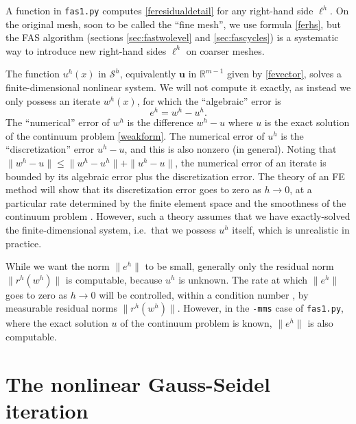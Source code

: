 \documentclass[letterpaper,final,12pt,reqno]{amsart}
\newcommand{\RR}{\mathbb{R}}
\newcommand{\bu}{\mathbf{u}}
\begin{document}
A function in \texttt{fas1.py} computes \eqref{feresidualdetail} for any right-hand side $\ell^h$.  On the original mesh, soon to be called the ``fine mesh'', we use formula \eqref{ferhs}, but the FAS algorithm (sections \ref{sec:fastwolevel} and \ref{sec:fascycles}) is a systematic way to introduce new right-hand sides $\ell^h$ on coarser meshes.

The function $u^h(x)$ in $\mathcal{S}^h$, equivalently $\bu$ in $\RR^{m-1}$ given by \eqref{fevector}, solves a finite-dimensional nonlinear system.  We will not compute it exactly, as instead we only possess an iterate $w^h(x)$, for which the ``algebraic'' error is
\begin{equation}
  e^h = w^h - u^h.  \label{feerror}
\end{equation}
The ``numerical'' error of $w^h$ is the difference $w^h-u$ where $u$ is the exact solution of the continuum problem \eqref{weakform}.  The numerical error of $u^h$ is the ``discretization'' error $u^h-u$, and this is also nonzero (in general).  Noting that $\|w^h-u\|\le \|w^h-u^h\|+\|u^h-u\|$, the numerical error of an iterate is bounded by its algebraic error plus the discretization error.  The theory of an FE method will show that its discretization error goes to zero as $h\to 0$, at a particular rate determined by the finite element space and the smoothness of the continuum problem \cite{Elmanetal2014}.  However, such a theory assumes that we have exactly-solved the finite-dimensional system, i.e.~that we possess $u^h$ itself, which is unrealistic in practice.

While we want the norm $\|e^h\|$ to be small, generally only the residual norm $\|r^h(w^h)\|$ is computable, because $u^h$ is unknown.  The rate at which $\|e^h\|$ goes to zero as $h\to 0$ will be controlled, within a condition number \cite{Greenbaum1997}, by measurable residual norms $\|r^h(w^h)\|$.  However, in the \texttt{-mms} case of \texttt{fas1.py}, where the exact solution $u$ of the continuum problem is known, $\|e^h\|$ is also computable.


\section{The nonlinear Gauss-Seidel iteration}  \label{sec:ngs}
\end{document}
